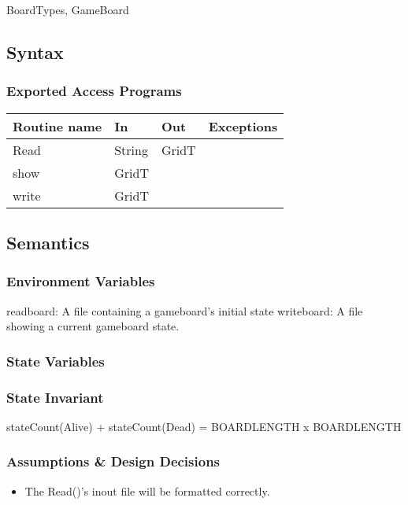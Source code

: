 \documentclass[12pt]{article}
\begin{document}
\noindent BoardTypes, GameBoard\\

\subsection* {Syntax}

\subsubsection* {Exported Access Programs}


\begin{tabular}{| l | l | l | l |}
\hline
\textbf{Routine name} & \textbf{In} & \textbf{Out} & \textbf{Exceptions}\\
\hline
Read  & String & GridT & \\
\hline
show & GridT &  & \\
\hline
write & GridT & &\\
\hline
\end{tabular}

\subsection* {Semantics}

\subsubsection* {Environment Variables}

readboard: A file containing a gameboard's initial state
writeboard: A file showing a current gameboard state.

\subsubsection* {State Variables}

\subsubsection* {State Invariant}

stateCount(Alive) + stateCount(Dead) = BOARDLENGTH x BOARDLENGTH

\subsubsection* {Assumptions \& Design Decisions}
\begin{itemize}
\item The Read()'s inout file will be formatted correctly.
\end{itemize}
\end{document}
